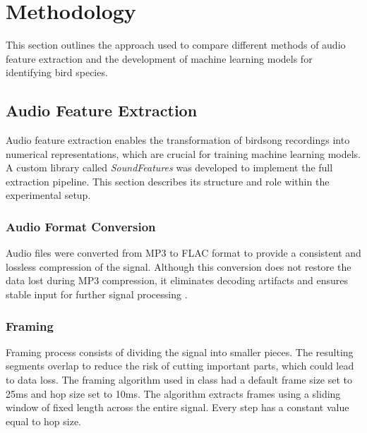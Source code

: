 \documentclass[
onecolumn,
]{ceurart}
\begin{document}



\section{Methodology}

This section outlines the approach used to compare different methods of audio feature extraction and the development of machine learning models for identifying bird species.

\subsection{Audio Feature Extraction}

Audio feature extraction enables the transformation of birdsong recordings into numerical representations, which are crucial for training machine learning models. A custom library called \textit{SoundFeatures} was developed to implement the full extraction pipeline. This section describes its structure and role within the experimental setup.

\subsubsection{Audio Format Conversion}

Audio files were converted from MP3 to FLAC format to provide a consistent and lossless compression of the signal. Although this conversion does not restore the data lost during MP3 compression, it eliminates decoding artifacts and ensures stable input for further signal processing \cite{shi2024data}.

\subsubsection{Framing}

Framing process consists of dividing the signal into smaller pieces. The resulting segments overlap to reduce the risk of cutting important parts, which could lead to data loss. The framing algorithm used in class had a default frame size set to 25ms and hop size set to 10ms. The algorithm extracts frames using a sliding window of fixed length across the entire signal. Every step has a constant value equal to hop size.
\\
\begin{algorithm}[H]
  \caption{Framing method}
  \SetAlgoLined
\end{algorithm}
\end{document}
